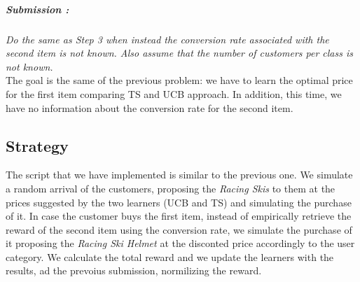 \subparagraph*{Submission : }
\textit{Do the same as Step 3 when instead the conversion rate associated with the second item is not known. Also assume that the number of customers per class is not known.}\\

The goal is the same of the previous problem: we have to learn the optimal price for the first item comparing TS and UCB approach. In addition, this time, we have no information about the conversion rate for the second item. 

\subsection*{Strategy}
The script that we have implemented is similar to the previous one. We simulate a random arrival of the customers, proposing the \textit{Racing Skis} to them at the prices suggested by the two learners (UCB and TS) and simulating the purchase of it. In case the customer buys the first item, instead of empirically retrieve the reward of the second item using the conversion rate, we simulate the purchase of it proposing the \textit{Racing Ski Helmet} at the disconted price accordingly to the user category. We calculate the total reward and we update the learners with the results, ad the prevoius submission, normilizing the reward. 

